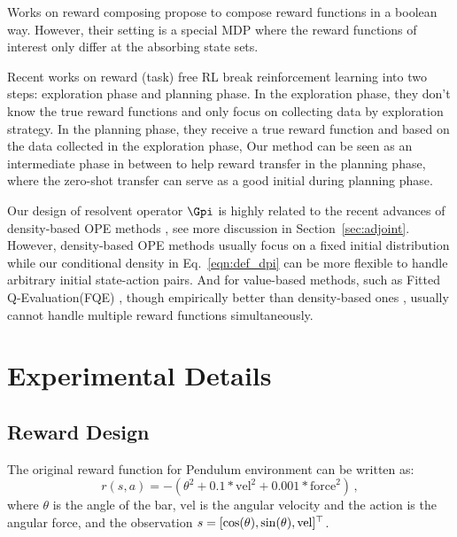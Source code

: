 Works on reward composing \citep{van2019composing, tasse2020boolean} propose to compose reward functions in a boolean way. However, their setting is a special MDP where the reward functions of interest only differ at the absorbing state sets.

Recent works on reward (task) free RL \citep[e.g.][]{wang2020reward,jin2020reward, zhang2020task} break reinforcement learning into two steps: exploration phase and planning phase.
In the exploration phase, they don't know the true reward functions and only focus on collecting data by exploration strategy.
In the planning phase, they receive a true reward function and based on the data collected in the exploration phase, 
Our method can be seen as an intermediate phase in between to help reward transfer in the planning phase, where the zero-shot transfer can serve as a good initial during planning phase.

Our design of resolvent operator $\Gpi$ is highly related to the recent advances of density-based OPE 
methods \citep[e.g.,][]{liu2018breaking, nachum2019dualdice, tang2019doubly,mousavi2019black, zhang2020gendice,zhang2020gradientdice}, see more discussion in Section~\ref{sec:adjoint}.
However, density-based OPE methods usually focus on a fixed initial distribution 
while our conditional density in Eq.~\eqref{eqn:def_dpi} can be more flexible to handle arbitrary initial state-action pairs.
And for value-based methods, such as Fitted Q-Evaluation(FQE) \citep[e.g,][]{voloshin2019empirical}, though empirically better than density-based ones \citep{fu2021benchmarks}, usually cannot handle multiple reward functions simultaneously.

\clearpage
\section{Experimental Details}
\label{sec:exp_appendix}

\subsection{Reward Design}

The original reward function for Pendulum environment can be written as: 
$$
r(s,a) = -(\theta^2 + 0.1 * \mathrm{vel}^2 + 0.001 * \mathrm{force}^2)\,,
$$
where $\theta$ is the angle of the bar, $\mathrm{vel}$ is the angular velocity and the action is the angular force,
and the observation $s = [\cos(\theta), \sin(\theta), \rm{vel}]^\top$.

